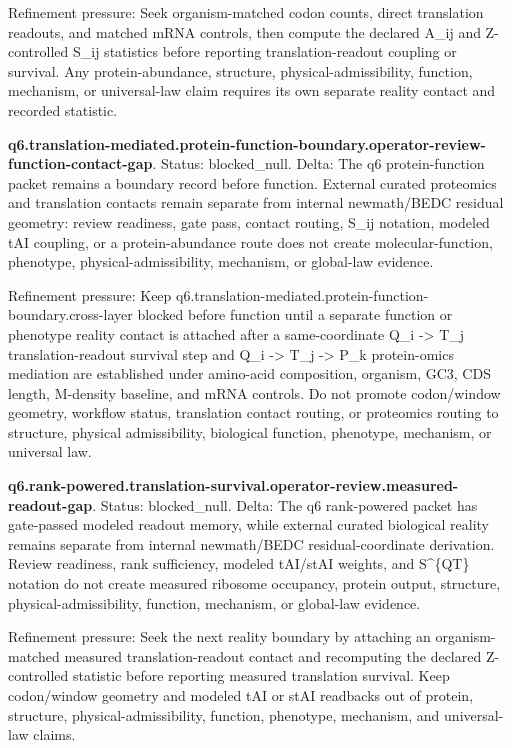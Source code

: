 Refinement pressure: Seek organism-matched codon counts, direct translation readouts, and matched mRNA controls, then compute the declared A\_ij and Z-controlled S\_ij statistics before reporting translation-readout coupling or survival. Any protein-abundance, structure, physical-admissibility, function, mechanism, or universal-law claim requires its own separate reality contact and recorded statistic.

\textbf{q6.translation-mediated.protein-function-boundary.operator-review-function-contact-gap}. Status: blocked\_null. Delta: The q6 protein-function packet remains a boundary record before function. External curated proteomics and translation contacts remain separate from internal newmath/BEDC residual geometry: review readiness, gate pass, contact routing, S\_ij notation, modeled tAI coupling, or a protein-abundance route does not create molecular-function, phenotype, physical-admissibility, mechanism, or global-law evidence.

Refinement pressure: Keep q6.translation-mediated.protein-function-boundary.cross-layer blocked before function until a separate function or phenotype reality contact is attached after a same-coordinate Q\_i -> T\_j translation-readout survival step and Q\_i -> T\_j -> P\_k protein-omics mediation are established under amino-acid composition, organism, GC3, CDS length, M-density baseline, and mRNA controls. Do not promote codon/window geometry, workflow status, translation contact routing, or proteomics routing to structure, physical admissibility, biological function, phenotype, mechanism, or universal law.

\textbf{q6.rank-powered.translation-survival.operator-review.measured-readout-gap}. Status: blocked\_null. Delta: The q6 rank-powered packet has gate-passed modeled readout memory, while external curated biological reality remains separate from internal newmath/BEDC residual-coordinate derivation. Review readiness, rank sufficiency, modeled tAI/stAI weights, and S\textasciicircum{}\{QT\} notation do not create measured ribosome occupancy, protein output, structure, physical-admissibility, function, mechanism, or global-law evidence.

Refinement pressure: Seek the next reality boundary by attaching an organism-matched measured translation-readout contact and recomputing the declared Z-controlled statistic before reporting measured translation survival. Keep codon/window geometry and modeled tAI or stAI readbacks out of protein, structure, physical-admissibility, function, phenotype, mechanism, and universal-law claims.

